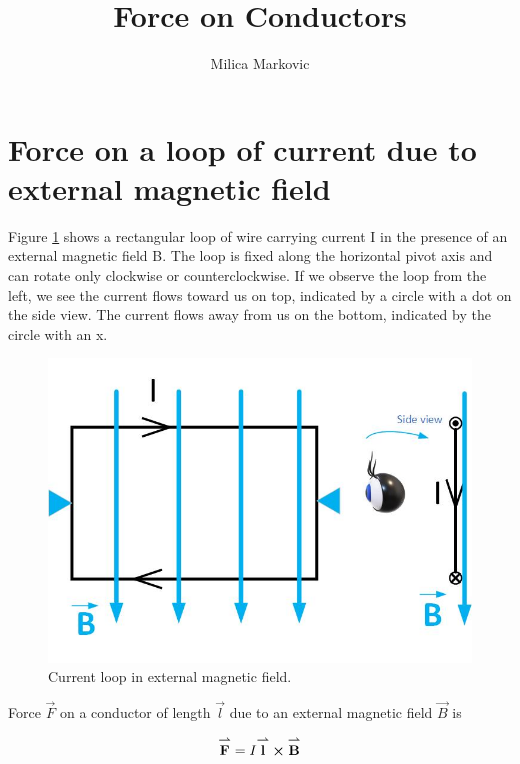 \documentclass{ximera}
\title{Force on Conductors}
\author{Milica Markovic}
\begin{document}
  
\begin{abstract}  

\end{abstract}  
\maketitle    



\section{Force on a loop of current due to external magnetic field}


Figure \ref{fig:currentLoop} shows a rectangular loop of wire carrying current I in the presence of an external magnetic field B. The loop is fixed along the horizontal pivot axis and can rotate only clockwise or counterclockwise. If we observe the loop from the left, we see the current flows toward us on top, indicated by a circle with a dot on the side view. The current flows away from us on the bottom, indicated by the circle with an x.


\begin{figure}[htbp]
\begin{center}
\includegraphics[scale=0.7]{../jpg/loop.jpg}
\end{center}
\caption{Current loop in external magnetic field. }
\label{fig:currentLoop}
\end{figure}


Force $\vec{F}$ on a conductor of length $\vec{l}$ due to an external magnetic field $\vec{B}$ is

\begin{equation}
{\overset{\boldsymbol{\rightharpoonup}}{\mathbf{F}}}\hspace{0in}=I {\overset{\boldsymbol{\rightharpoonup}}{\mathbf{l}}}\hspace{0in} \boldsymbol\times {\overset{\boldsymbol{\rightharpoonup}}{\mathbf{B}}}\hspace{0in}
\end{equation}
\end{document}
